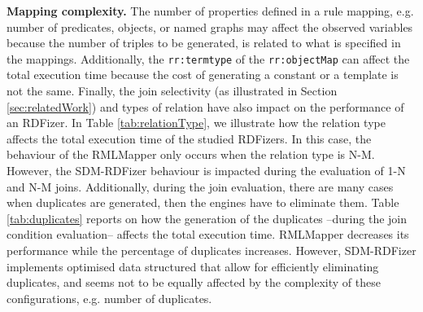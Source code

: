 \noindent \textbf{Mapping complexity.} The number of properties defined in a rule mapping, e.g. number of predicates, objects, or named graphs may affect the observed variables because the number of triples to be generated, is related to what is specified in the mappings. Additionally, the \texttt{rr:termtype} of the \texttt{rr:objectMap} can affect the total execution time because the cost of generating a constant or a template is not the same. Finally, the join selectivity (as illustrated in Section \ref{sec:relatedWork}) and types of relation have also impact on the performance of an RDFizer. In Table \ref{tab:relationType}, we illustrate how the relation type affects the total execution time of the studied RDFizers. In this case, the behaviour of the RMLMapper only occurs when the relation type is N-M. However, the SDM-RDFizer behaviour is impacted during the evaluation of 1-N and N-M joins. Additionally, during the join evaluation, there are many cases when duplicates are generated, then the engines have to eliminate them. Table \ref{tab:duplicates} reports on how the generation of the duplicates --during the join condition evaluation-- affects the total execution time. RMLMapper decreases its performance while the percentage of duplicates increases. However,  SDM-RDFizer implements optimised data structured that allow for efficiently eliminating duplicates, and seems not to be equally affected by the complexity of these configurations, e.g. number of duplicates. 

